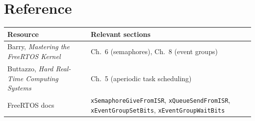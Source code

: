 \documentclass[11pt, a4paper]{article}
\begin{document}
\section{Reference}

\renewcommand{\arraystretch}{1.3}
\begin{tabular}{@{} p{5.5cm} p{7.5cm} @{}}
  \toprule
  \textbf{Resource} & \textbf{Relevant sections} \\
  \midrule
  Barry, \textit{Mastering the FreeRTOS Kernel} &
    Ch.~6 (semaphores), Ch.~8 (event groups) \\
  Buttazzo, \textit{Hard Real-Time Computing Systems} &
    Ch.~5 (aperiodic task scheduling) \\
  FreeRTOS docs &
    \texttt{xSemaphoreGiveFromISR}, \texttt{xQueueSendFromISR},
    \texttt{xEventGroupSetBits}, \texttt{xEventGroupWaitBits} \\
  \bottomrule
\end{tabular}
\renewcommand{\arraystretch}{1}
\end{document}
